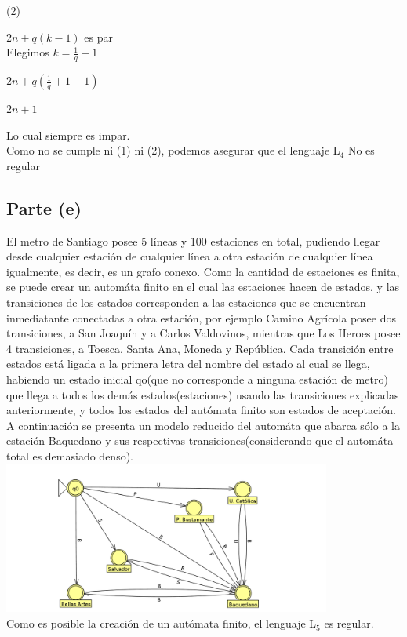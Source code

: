 \documentclass[11pt,letterpaper]{article}
\begin{document}
(2) 

$2n+q(k-1)$ es par
 \\
 
Elegimos $k = \frac{1}{q} + 1$

$2n+q(\frac{1}{q} + 1 -1)$

$2n+1$

Lo cual siempre es impar.
 \\

Como no se cumple ni (1) ni (2), podemos asegurar que el lenguaje L$_{4}$ No es regular


\subsection{Parte (e)}
El metro de Santiago posee 5 líneas y 100 estaciones en total, pudiendo llegar desde cualquier estación de cualquier línea a otra estación de cualquier línea igualmente, es decir, es un grafo conexo. Como la cantidad de estaciones es finita, se puede crear un automáta finito en el cual las estaciones hacen de estados, y las transiciones de los estados corresponden a las estaciones que se encuentran inmediatante conectadas a otra estación, por ejemplo Camino Agrícola posee dos transiciones, a San Joaquín y a Carlos Valdovinos, mientras que Los Heroes posee 4 transiciones, a Toesca, Santa Ana, Moneda y República. Cada transición entre estados está ligada a la primera letra del nombre del estado al cual se llega, habiendo un estado inicial qo(que no corresponde a ninguna estación de metro) que llega a todos los demás estados(estaciones) usando las transiciones explicadas anteriormente, y todos los estados del autómata finito son estados de aceptación. A continuación se presenta un modelo reducido del automáta que abarca sólo a la estación Baquedano y sus respectivas transiciones(considerando que el automáta total es demasiado denso).
 \\
\includegraphics[height=5cm]{tarea_3-e.png}
 \\
Como es posible la creación de un autómata finito, el lenguaje L$_{5}$ es regular.
\end{document}
